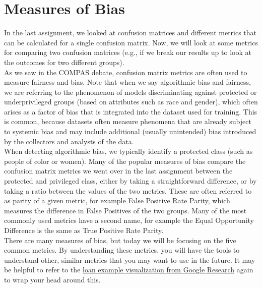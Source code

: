 \documentclass[assignment03_Solutions]{subfiles}
\begin{document}
\section{Measures of Bias}
In the last assignment, we looked at confusion matrices and different metrics that can be calculated for a single confusion matrix. Now, we will look at some metrics for comparing two confusion matrices (e.g., if we break our results up to look at the outcomes for two different groups).\\

As we saw in the COMPAS debate, confusion matrix metrics are often used to measure fairness and bias. Note that when we say algorithmic bias and fairness, we are referring to the phenomenon of models discriminating against protected or underprivileged groups (based on attributes such as race and gender), which often arises as a factor of bias that is integrated into the dataset used for training. This is common, because datasets often measure phenomena that are already subject to systemic bias and may include additional (usually unintended) bias introduced by the collectors and analysts of the data.\\ 
When detecting algorithmic bias, we typically identify a protected class (such as people of color or women). Many of the popular measures of bias compare the confusion matrix metrics we went over in the last assignment between the protected and privileged class, either by taking a straightforward difference, or by taking a ratio between the values of the two metrics. These are often referred to as parity of a given metric, for example False Positive Rate Parity, which measures the difference in False Positives of the two groups. Many of the most commonly used metrics have a second name, for example the Equal Opportunity Difference is the same as True Positive Rate Parity.\\
There are many measures of bias, but today we will be focusing on the five common metrics. By understanding these metrics, you will have the tools to understand other, similar metrics that you may want to use in the future. It may be helpful to refer to the \href{http://research.google.com/bigpicture/attacking-discrimination-in-ml/}{loan example visualization from Google Research} again to wrap your head around this.
\end{document}
